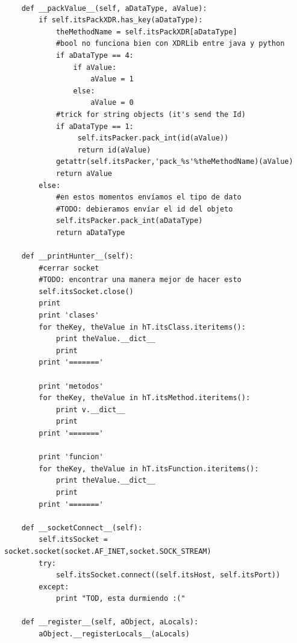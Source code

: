 \documentclass[12pt,legalpaper]{report}
\begin{document}
\begin{singlespace}
\begin{lstlisting}[style=Python]
    
    def __packValue__(self, aDataType, aValue):
        if self.itsPackXDR.has_key(aDataType):
            theMethodName = self.itsPackXDR[aDataType]
            #bool no funciona bien con XDRLib entre java y python
            if aDataType == 4:
                if aValue:
                    aValue = 1
                else:
                    aValue = 0
            #trick for string objects (it's send the Id)
            if aDataType == 1:
                 self.itsPacker.pack_int(id(aValue))
                 return id(aValue)
            getattr(self.itsPacker,'pack_%s'%theMethodName)(aValue)
            return aValue            
        else:
            #en estos momentos envíamos el tipo de dato
            #TODO: debieramos envíar el id del objeto
            self.itsPacker.pack_int(aDataType)
            return aDataType

    def __printHunter__(self):
        #cerrar socket
        #TODO: encontrar una manera mejor de hacer esto
        self.itsSocket.close()
        print
        print 'clases'
        for theKey, theValue in hT.itsClass.iteritems():
            print theValue.__dict__
            print
        print '======='
        
        print 'metodos'
        for theKey, theValue in hT.itsMethod.iteritems():
            print v.__dict__
            print
        print '======='
        
        print 'funcion'
        for theKey, theValue in hT.itsFunction.iteritems():
            print theValue.__dict__
            print
        print '======='
        
    def __socketConnect__(self):
        self.itsSocket = socket.socket(socket.AF_INET,socket.SOCK_STREAM)
        try:
            self.itsSocket.connect((self.itsHost, self.itsPort))
        except:
            print "TOD, esta durmiendo :("
    
    def __register__(self, aObject, aLocals):
        aObject.__registerLocals__(aLocals)


\end{lstlisting}
\end{singlespace}
\end{document}
